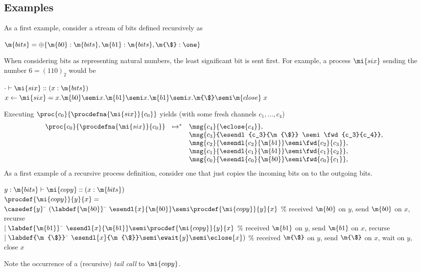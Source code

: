\subsection{Examples}
As a first example, consider a stream of bits defined recursively as
\begin{sill}
  $\m{bits} = {\oplus}\{\m{b0} : \m{bits}, \m{b1} : \m{bits}, \m{\$} : \one\}$
\end{sill}
When considering bits as representing natural numbers, the
least significant bit is sent first.  For example, a process
$\mi{six}$ sending the number $6 = (110)_2$ would be
\begin{sill}
$\cdot \vdash \mi{six} :: (x : \m{bits})$ \\
$x \leftarrow \mi{six} = x.\m{b0} \semi x.\m{b1} \semi x.\m{b1} \semi x.\m{\$} \semi \m{close}\; x$
\end{sill}
Executing $\proc{c_0}{\procdefna{\mi{six}}{c_0}}$ yields
(with some fresh channels $c_1, \ldots, c_4$)
\[
\begin{array}{lcl}
\proc{c_0}{\procdefna{\mi{six}}{c_0}}
& \mapsto^* &
\msg{c_4}{\eclose{c_4}}, \\
 & &\msg{c_3}{\esendl{c_3}{\m{\$}} \semi \fwd{c_3}{c_4}}, \\
 & &\msg{c_2}{\esendl{c_2}{\m{b1}} \semi \fwd{c_2}{c_3}}, \\
 & &\msg{c_1}{\esendl{c_1}{\m{b1}} \semi \fwd{c_1}{c_2}}, \\
 & &\msg{c_0}{\esendl{c_0}{\m{b0}} \semi \fwd{c_0}{c_1}}, \\
\end{array}
\]
As a first example of a recursive process definition, consider one
that just copies the incoming bits on to the outgoing bits.
\begin{sill}
$y : \m{bits} \vdash \mi{copy} :: (x : \m{bits})$ \\
$\procdef{\mi{copy}}{y}{x} = $ \\
\quad $\casedef{y}$ \= $(\labdef{\m{b0}}$ \= $\esendl{x}{\m{b0}} \semi
\procdef{\mi{copy}}{y}{x}$ 
\hspace{1em}\=
\% received $\m{b0}$ on $y$, send $\m{b0}$ on $x$, recurse \\
\> $\mid \labdef{\m{b1}}$ \= $\esendl{x}{\m{b1}} \semi
\procdef{\mi{copy}}{y}{x}$ 
\> \% received $\m{b1}$ on $y$, send $\m{b1}$ on $x$, recurse \\
\> $\mid \labdef{\m{\$}}$ \= $\esendl{x}{\m{\$}} \semi
\ewait{y} \semi \eclose{x})$
\> \% received $\m{\$}$ on $y$,
send $\m{\$}$ on $x$, wait on $y$, close $x$
\end{sill}
Note the occurrence of a (recursive) \emph{tail call} to $\mi{copy}$.

